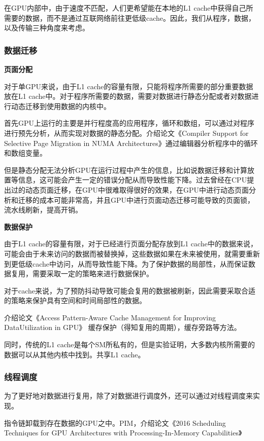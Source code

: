 \documentclass{cjc}
\begin{document}
在GPU内部中，由于速度不匹配，人们更希望能在本地的L1 cache中获得自己所需要的数据，而不是通过互联网络前往更低级cache。因此，我们从程序，数据，以及传输三种角度来考虑。

\subsubsection{数据迁移}

\textbf{页面分配}

对于单GPU来说，由于L1 cache的容量有限，只能将程序所需要的部分重要数据放在L1 cache中。对于程序所需要的数据，需要对数据进行静态分配或者对数据进行动态迁移到使用数据的内核中。

首先GPU上运行的主要是并行程度高的应用程序，循环和数组，可以通过对程序进行预先分析，从而实现对数据的静态分配。介绍论文《Compiler Support for Selective Page Migration in NUMA Architectures》通过编辑器分析程序中的循环和数组变量。

但是静态分配无法分析GPU在运行过程中产生的信息，比如说数据迁移和计算放置等信息，这可能会产生一定的错误分配从而导致性能下降。过去曾经在CPU提出过的动态页面迁移，在GPU中很难取得很好的效果，在GPU中进行动态页面分析和迁移的成本可能非常高，并且GPU中进行页面动态迁移可能导致的页面锁，流水线刷新，提高开销。

\textbf{数据保护}

由于L1 cache的容量有限，对于已经进行页面分配存放到L1 cache中的数据来说，可能会由于未来访问的数据而被替换掉，这些数据如果在未来被使用，就需要重新到更低级cache中访问，从而导致性能下降。为了保护数据的局部性，从而保证数据复用，需要采取一定的策略来进行数据保护。

对于cache来说，为了预防抖动导致可能会复用的数据被刷新，因此需要采取合适的策略来保护具有空间和时间局部性的数据。

介绍论文《Access Pattern-Aware Cache Management for Improving DataUtilization in GPU》
缓存保护（得知复用的周期），缓存旁路等方法。

同时，传统的L1 cache是每个SM所私有的，但是实验证明，大多数内核所需要的数据可以从其他内核中找到。共享L1 cache。

\subsubsection{线程调度}

为了更好地对数据进行复用，除了对数据进行调度外，还可以通过对线程调度来实现。

指令链卸载到存在数据的GPU之中。PIM，介绍论文《2016 Scheduling Techniques for GPU Architectures with Processing-In-Memory Capabilities》
\end{document}
